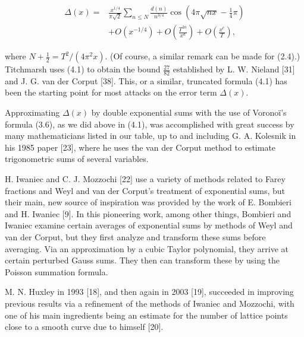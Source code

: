 \documentclass[10pt]{article}
\theoremstyle{plain}
\begin{document}
\begin{align*}
\Delta(x)= & \frac{x^{1 / 4}}{\pi \sqrt{2}} \sum_{n \leq N} \frac{d(n)}{n^{3 / 4}} \cos \left(4 \pi \sqrt{n x}-\frac{1}{4} \pi\right) \\
& +O\left(x^{-1 / 4}\right)+O\left(\frac{T^{2 a}}{x^{a}}\right)+O\left(\frac{x^{c}}{T}\right), \tag{4.1}
\end{align*}


where $N+\frac{1}{2}=T^{2} /\left(4 \pi^{2} x\right)$. (Of course, a similar remark can be made for (2.4).) Titchmarsh uses (4.1) to obtain the bound $\frac{27}{82}$ established by L. W. Nieland [31] and J. G. van der Corput [38]. This, or a similar, truncated formula (4.1) has been the starting point for most attacks on the error term $\Delta(x)$.

Approximating $\Delta(x)$ by double exponential sums with the use of Voronoï's formula (3.6), as we did above in (4.1), was accomplished with great success by many mathematicians listed in our table, up to and including G. A. Kolesnik in his 1985 paper [23], where he uses the van der Corput method to estimate trigonometric sums of several variables.

H. Iwaniec and C. J. Mozzochi [22] use a variety of methods related to Farey fractions and Weyl and van der Corput's treatment of exponential sums, but their main, new source of inspiration was provided by the work of E. Bombieri and H. Iwaniec [9]. In this pioneering work, among other things, Bombieri and Iwaniec examine certain averages of exponential sums by methods of Weyl and van der Corput, but they first analyze and transform these sums before averaging. Via an approximation by a cubic Taylor polynomial, they arrive at certain perturbed Gauss sums. They then can transform these by using the Poisson summation formula.

M. N. Huxley in 1993 [18], and then again in 2003 [19], succeeded in improving previous results via a refinement of the methods of Iwaniec and Mozzochi, with one of his main ingredients being an estimate for the number of lattice points close to a smooth curve due to himself [20].
\end{document}
